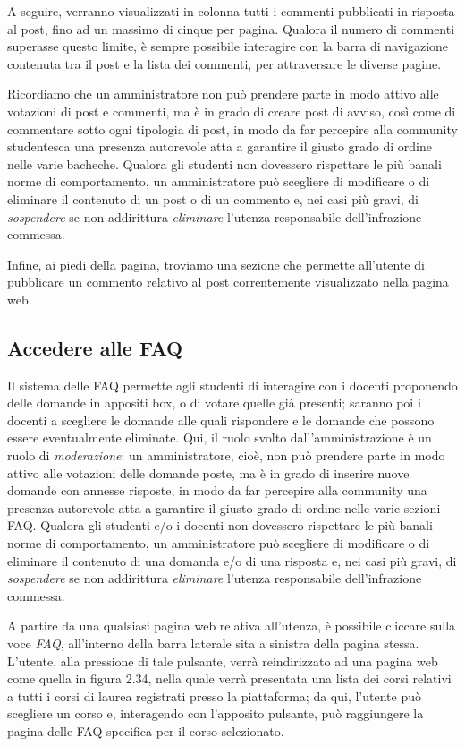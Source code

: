 \documentclass [a4paper,11pt]{book}
\begin{document}
A seguire, verranno visualizzati in colonna tutti i commenti pubblicati in risposta al post, fino ad un massimo di cinque per pagina. Qualora il numero di commenti superasse questo limite, è sempre possibile interagire con la barra di navigazione contenuta tra il post e la lista dei commenti, per attraversare le diverse pagine. 

Ricordiamo che un amministratore non può prendere parte in modo attivo alle votazioni di post e commenti, ma è in grado di creare post di avviso, così come di commentare sotto ogni tipologia di post, in modo da far percepire alla community studentesca una presenza autorevole atta a garantire il giusto grado di ordine nelle varie bacheche. Qualora gli studenti non dovessero rispettare le più banali norme di comportamento, un amministratore può scegliere di modificare o di eliminare il contenuto di un post o di un commento e, nei casi più gravi, di \emph{sospendere} se non addirittura \emph{eliminare} l'utenza responsabile dell'infrazione commessa.

Infine, ai piedi della pagina, troviamo una sezione che permette all'utente di pubblicare un commento relativo al post correntemente visualizzato nella pagina web.

\medskip

\subsection{Accedere alle FAQ}

Il sistema delle FAQ permette agli studenti di interagire con i docenti proponendo delle domande in appositi box, o di votare quelle già presenti; saranno poi i docenti a scegliere le domande alle quali rispondere e le domande che possono essere eventualmente eliminate. Qui, il ruolo svolto dall'amministrazione è un ruolo di \emph{moderazione}: un amministratore, cioè, non può prendere parte in modo attivo alle votazioni delle domande poste, ma è in grado di inserire nuove domande con annesse risposte, in modo da far percepire alla community una presenza autorevole atta a garantire il giusto grado di ordine nelle varie sezioni FAQ. Qualora gli studenti e/o i docenti non dovessero rispettare le più banali norme di comportamento, un amministratore può scegliere di modificare o di eliminare il contenuto di una domanda e/o di una risposta e, nei casi più gravi, di \emph{sospendere} se non addirittura \emph{eliminare} l'utenza responsabile dell'infrazione commessa.

A partire da una qualsiasi pagina web relativa all'utenza, è possibile cliccare sulla voce \emph{FAQ}, all'interno della barra laterale sita a sinistra della pagina stessa. L'utente, alla pressione di tale pulsante, verrà reindirizzato ad una pagina web come quella in figura 2.34, nella quale verrà presentata una lista dei corsi relativi a tutti i corsi di laurea registrati presso la piattaforma; da qui, l'utente può scegliere un corso e, interagendo con l'apposito pulsante, può raggiungere la pagina delle FAQ specifica per il corso selezionato.
\end{document}
